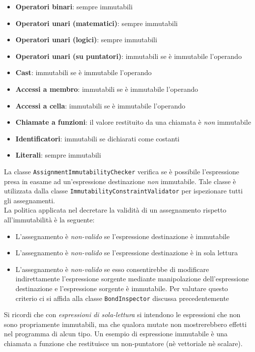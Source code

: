 \begin{itemize}
    \item \textbf{Operatori binari}: sempre immutabili
    \item \textbf{Operatori unari (matematici)}: sempre immutabili
    \item \textbf{Operatori unari (logici)}: sempre immutabili
    \item \textbf{Operatori unari (su puntatori)}: immutabili se è immutabile l'operando
    \item \textbf{Cast}: immutabili se è immutabile l'operando
    \item \textbf{Accessi a membro}: immutabili se è immutabile l'operando
    \item \textbf{Accessi a cella}: immutabili se è immutabile l'operando
    \item \textbf{Chiamate a funzioni}: il valore restituito da una chiamata è \textit{non} immutabile
    \item \textbf{Identificatori}: immutabili se dichiarati come costanti
    \item \textbf{Literali}: sempre immutabili
\end{itemize}

La classe \texttt{AssignmentImmutabilityChecker} verifica se è possibile l'espressione presa in easame 
ad un'espressione destinazione \textit{non} immutabile. Tale classe è utilizzata dalla classe 
\texttt{ImmutabilityConstraintValidator} per ispezionare tutti gli assegnamenti. \\

La politica applicata nel decretare la validità di un assegnamento rispetto all'immutabilità è la seguente:

\begin{itemize}
    \item L'assegnamento è \textit{non-valido} se l'espressione destinazione è immutabile
    \item L'assegnamento è \textit{non-valido} se l'espressione destinazione è in sola lettura
    \item L'assegnamento è \textit{non-valido} se esso consentirebbe di modificare indirettamente 
    l'espressione sorgente mediante manipolazione dell'espressione destinazione e l'espressione sorgente 
    è immutabile. Per valutare questo criterio ci si affida alla classe \texttt{BondInspector} discussa 
    precedentemente
\end{itemize}

Si ricordi che con \textit{espressioni di sola-lettura} si intendono le espressioni che non sono propriamente 
immutabili, ma che qualora mutate non mostrerebbero effetti nel programma di alcun tipo. Un esempio di espressione 
immutabile è una chiamata a funzione che restituisce un non-puntatore (nè vettoriale nè scalare). \\
